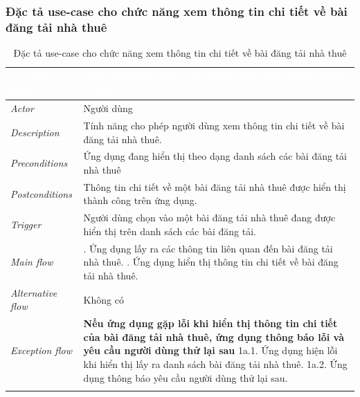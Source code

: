 \subsubsection{Đặc tả use-case cho chức năng xem thông tin chi tiết về bài đăng tải nhà thuê}
\begin{center}
    \arrayrulewidth=2pt
    \begin{longtable}{
        |>{\raggedright\arraybackslash}p{3cm}
        |>{\raggedright\arraybackslash}p{13cm}
        |}
        \hline
        \rowcolor{cyan!75!black} \textcolor{white}{\textbf{Use-case name}} & \textcolor{white}{\textbf{XEM THÔNG TIN CHI TIẾT VỀ BÀI ĐĂNG NHÀ THUÊ}}
        \\\hline
        \rowcolor{cyan!10!white} \textit{Actor} & Người dùng
        \\\hdashline
        \rowcolor{cyan!10!white} \textit{Description} & Tính năng cho phép người dùng xem thông tin chi tiết về bài đăng tải nhà thuê.
        \\\hdashline
        \rowcolor{cyan!10!white} \textit{Preconditions} & Ứng dụng đang hiển thị theo dạng danh sách các bài đăng tải nhà thuê
        \\\hdashline
        \rowcolor{cyan!10!white} \textit{Postconditions} & Thông tin chi tiết về một bài đăng tải nhà thuê được hiển thị thành công trên ứng dụng.
        \\\hdashline
        \rowcolor{cyan!10!white} \textit{Trigger} & Người dùng chọn vào một bài đăng tải nhà thuê đang được hiển thị trên danh sách các bài đăng tải.
        \\\hdashline
        \rowcolor{cyan!10!white} \textit{Main flow} &
        1. Ứng dụng lấy ra các thông tin liên quan đến bài đăng tải nhà thuê. \newline
        2. Ứng dụng hiển thị thông tin chi tiết về bài đăng tải nhà thuê.
        \\\hdashline
        \rowcolor{cyan!10!white} \textit{Alternative flow} & Không có
        \\\hdashline
        \rowcolor{cyan!10!white} \textit{Exception flow} &
        \textbf{Nếu ứng dụng gặp lỗi khi hiển thị thông tin chi tiết của bài đăng tải nhà thuê, ứng dụng thông báo lỗi và yêu cầu người dùng thử lại sau} \newline
        1a.1. Ứng dụng hiện lỗi khi hiển thị lấy ra danh sách bài đăng tải nhà thuê. \newline
        1a.2. Ứng dụng thông báo yêu cầu người dùng thử lại sau.
        \\\hline
        \caption{Đặc tả use-case cho chức năng xem thông tin chi tiết về bài đăng tải nhà thuê}
    \end{longtable}
\end{center}